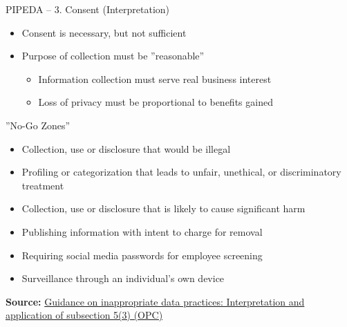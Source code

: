 \documentclass[ignorenonframetext,xcolor=x11names]{beamer}
\begin{document}
\begin{frame}[label=full]{PIPEDA -- 3. Consent \small (Interpretation)}
\begin{itemize}
   \item Consent is necessary, but not sufficient
   \item Purpose of collection must be ''reasonable''
   \begin{itemize}
   \item Information collection must serve real business interest
   \item Loss of privacy must be proportional to benefits gained
   \end{itemize}
\end{itemize}
\begin{block}{''No-Go Zones''}
\begin{itemize}
   \item Collection, use or disclosure that would be illegal
   \item Profiling or categorization that leads to unfair, unethical, or discriminatory treatment
   \item Collection, use or disclosure that is likely to cause significant harm
   \item Publishing information with intent to charge for removal
   \item Requiring social media passwords for employee screening
   \item Surveillance through an individual's own device
\end{itemize}
\end{block}

\vspace{.5\baselineskip}
\scriptsize \textbf{Source:} \href{https://www.priv.gc.ca/en/privacy-topics/collecting-personal-information/consent/gd_53_201805/}{Guidance on inappropriate data practices: Interpretation and application of subsection 5(3) (OPC)}
\end{frame}
\end{document}
